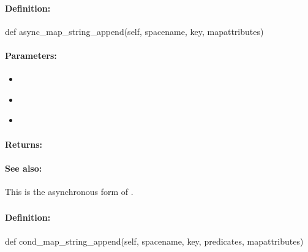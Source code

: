 \paragraph{Definition:}
\begin{pythoncode}
def async_map_string_append(self, spacename, key, mapattributes)
\end{pythoncode}

\paragraph{Parameters:}
\begin{itemize}[noitemsep]
\item {}\\

\item {}\\

\item {}\\

\end{itemize}

\paragraph{Returns:}


\paragraph{See also:}  This is the asynchronous form of .

\pagebreak
\subsubsection{}
\label{api:python:cond_map_string_append}


\paragraph{Definition:}
\begin{pythoncode}
def cond_map_string_append(self, spacename, key, predicates, mapattributes)
\end{pythoncode}

